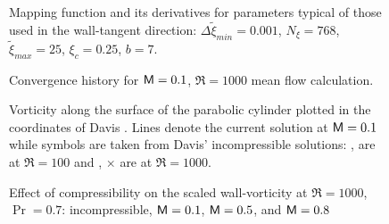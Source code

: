%
\begin{figure}[p]
\centering
\setvlabel{$\tilde\xi$}
\epsfxsize=4in 
\setvlabel{$\tilde\xi_{,\xi}$}
\epsfxsize=4in 
\sethlabel{$\xi$}
\setvlabel{$\tilde\xi_{,\xi\xi}$}
\epsfxsize=4in 
\caption [Mapping function and its derivatives.]{Mapping function and its derivatives for
parameters typical of those used in the wall-tangent direction:
$\Delta\tilde\xi_{min}=0.001$, $N_\xi = 768$, $\tilde\xi_{max}=25$,
$\xi_c=0.25$, $b=7$.
\label{f:map}}
\end{figure}
%
%
%
%
\begin{figure}[p]
\centering
{}
\epsfxsize=5.4in 
\caption {Convergence history for ${\sf M}=0.1$, $\Re=1000$ mean flow calculation.
\label{f:conv}}
\end{figure}
%
%
\begin{figure}[p]
\centering
{}
\epsfxsize=5.4in 
\caption [Vorticity along the surface plotted in the
coordinates of Davis \protect\cite{Davis:72}.]{Vorticity along the surface of
the parabolic cylinder plotted in the coordinates of Davis
\protect\cite{Davis:72}.  Lines denote the current solution at ${\sf M}=0.1$ while
symbols are taken from Davis' incompressible solutions: \solid, \scircle are
at $\Re=100$ and \dotted, $\times$ are at $\Re=1000$. \label{f:davis}}
\end{figure}
%
\clearpage
%
%
\begin{figure}[p]
\centering
{}
\epsfxsize=5.4in 
\caption [Effect of compressibility on the scaled wall-vorticity]{Effect of
compressibility on the scaled wall-vorticity at $\Re=1000$, $\Pr = 0.7$:
\scircle incompressible, \solid ${\sf M}=0.1$, \dashed ${\sf M}=0.5$, and \dotted
${\sf M}=0.8$
\label{f:mach} }
\end{figure}
